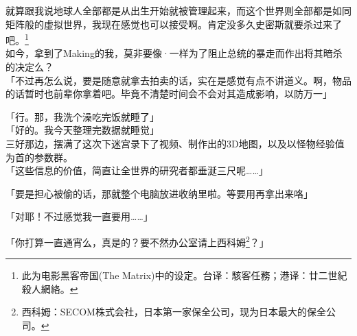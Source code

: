 就算跟我说地球人全部都是从出生开始就被管理起来，而这个世界则全部都是如同矩阵般的虚拟世界，我现在感觉也可以接受啊。肯定没多久史密斯就要杀过来了吧。\footnote{此为电影黑客帝国(The Matrix)中的设定。台译：駭客任務；港译：廿二世紀殺人網絡。}\\

如今，拿到了Making的我，莫非要像·一样为了阻止总统的暴走而作出将其暗杀的决定么？\\

「不过再怎么说，要是随意就拿去拍卖的话，实在是感觉有点不讲道义。啊，物品的话暂时也前辈你拿着吧。毕竟不清楚时间会不会对其造成影响，以防万一」

「行。那，我洗个澡吃完饭就睡了」\\

「好的。我今天整理完数据就睡觉」\\

三好那边，摆满了这次下迷宫录下了视频、制作出的3D地图，以及以怪物经验值为首的参数群。\\

「这些信息的价值，简直让全世界的研究者都垂涎三尺呢……」

「要是担心被偷的话，那就整个电脑放进收纳里啦。等要用再拿出来咯」

「对耶！不过感觉我一直要用……」

「你打算一直通宵么，真是的？要不然办公室请上西科姆\footnote{西科姆：SECOM株式会社，日本第一家保全公司，现为日本最大的保全公司。}？」

